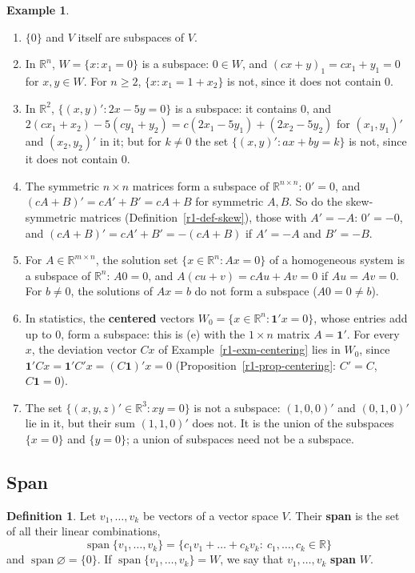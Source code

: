 \documentclass[12pt]{article}
\newcommand{\R}{\mathbb R}
\newcommand{\one}{\mathbf 1}
\DeclareMathOperator{\Span}{span}
\theoremstyle{definition}
\newtheorem{definition}[theorem]{Definition}
\newtheorem{example}[theorem]{Example}
\begin{document}
\begin{example}\label{r3-exm-subspaces}
\begin{enumerate}
\item \(\{0\}\) and \(V\) itself are subspaces of \(V\).
\item In \(\R^n\), \(W=\{x:x_1=0\}\) is a subspace: \(0\in W\), and
\((cx+y)_1=cx_1+y_1=0\) for \(x,y\in W\). For \(n\geqslant2\), \(\{x:x_1=1+x_2\}\) is not,
since it does not contain \(0\).
\item In \(\R^2\), \(\{(x,y)':2x-5y=0\}\) is a subspace: it contains \(0\), and
\(2(cx_1+x_2)-5(cy_1+y_2)=c(2x_1-5y_1)+(2x_2-5y_2)\) for \((x_1,y_1)'\) and \((x_2,y_2)'\) in
it; but for \(k\ne0\) the set
\(\{(x,y)':ax+by=k\}\) is not, since it does not contain \(0\).
\item The symmetric \(n\times n\) matrices form a subspace of \(\R^{n\times n}\): \(0'=0\),
and \((cA+B)'=cA'+B'=cA+B\) for symmetric \(A,B\). So do the skew-symmetric matrices
(Definition~\ref{r1-def-skew}), those with \(A'=-A\): \(0'=-0\), and \((cA+B)'=cA'+B'=-(cA+B)\) if \(A'=-A\) and
\(B'=-B\).
\item For \(A\in\R^{m\times n}\), the solution set \(\{x\in\R^n:Ax=0\}\) of a homogeneous
system is a subspace of \(\R^n\): \(A0=0\), and \(A(cu+v)=cAu+Av=0\) if \(Au=Av=0\). For
\(b\ne0\), the solutions of \(Ax=b\) do not form a subspace (\(A0=0\ne b\)).
\item In statistics, the \textbf{centered} vectors \(W_0=\{x\in\R^n:\one'x=0\}\), whose
entries add up to \(0\), form a subspace: this is (e) with the \(1\times n\) matrix
\(A=\one'\). For every \(x\), the deviation vector \(Cx\) of Example~\ref{r1-exm-centering} lies in \(W_0\),
since \(\one'Cx=\one'C'x=(C\one)'x=0\) (Proposition~\ref{r1-prop-centering}: \(C'=C\), \(C\one=0\)).
\item The set \(\{(x,y,z)'\in\R^3:xy=0\}\) is not a subspace: \((1,0,0)'\) and
\((0,1,0)'\) lie in it, but their sum \((1,1,0)'\) does not. It is the union of the
subspaces \(\{x=0\}\) and \(\{y=0\}\); a union of subspaces need not be a subspace.
\end{enumerate}
\end{example}

\subsection*{Span}

\begin{definition}\label{r3-def-span}
Let \(v_1,\dots,v_k\) be vectors of a vector space \(V\). Their \textbf{span} is the set of all
their linear combinations,
\[
\Span\{v_1,\dots,v_k\}=\{c_1v_1+\dots+c_kv_k:\ c_1,\dots,c_k\in\R\}
\]
and \(\Span\varnothing=\{0\}\). If \(\Span\{v_1,\dots,v_k\}=W\), we say that \(v_1,\dots,v_k\)
\textbf{span} \(W\).
\end{definition}
\end{document}
